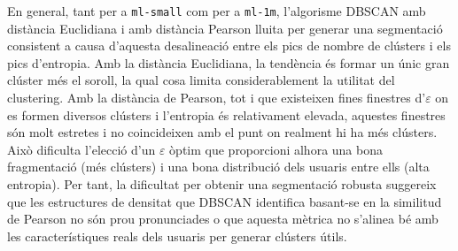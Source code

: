 \documentclass[a4paper,12pt]{report}
\begin{document}
En general, tant per a \texttt{ml-small} com per a \texttt{ml-1m}, l’algorisme DBSCAN amb distància Euclidiana i amb distància Pearson lluita per generar una segmentació consistent a causa d’aquesta desalineació entre els pics de nombre de clústers i els pics d’entropia. Amb la distància Euclidiana, la tendència és formar un únic gran clúster més el soroll, la qual cosa limita considerablement la utilitat del clustering. Amb la distància de Pearson, tot i que existeixen fines finestres d’\(\varepsilon\) on es formen diversos clústers i l’entropia és relativament elevada, aquestes finestres són molt estretes i no coincideixen amb el punt on realment hi ha més clústers. Això dificulta l’elecció d’un \(\varepsilon\) òptim que proporcioni alhora una bona fragmentació (més clústers) i una bona distribució dels usuaris entre ells (alta entropia). Per tant, la dificultat per obtenir una segmentació robusta suggereix que les estructures de densitat que DBSCAN identifica basant-se en la similitud de Pearson no són prou pronunciades o que aquesta mètrica no s’alinea bé amb les característiques reals dels usuaris per generar clústers útils.
\end{document}
